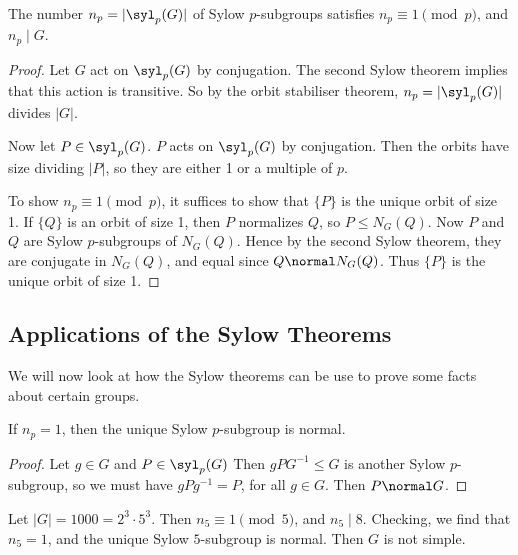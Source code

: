\documentclass[a4paper]{scrartcl}
\begin{document}
\begin{theorem}
	The number $n_p = |\syl_p(G)|$ of Sylow $p$-subgroups satisfies $n_p \equiv 1 \pmod{p}$, and $n_p \mid G$. 
\end{theorem}
\begin{proof}
	Let $G$ act on $\syl_p(G)$ by conjugation. The second Sylow theorem implies that this action is transitive. So by the orbit stabiliser theorem, $n_p = |\syl_p(G)|$ divides $|G|$.

	Now let $P \in \syl_p(G)$. $P$ acts on $\syl_p(G)$ by conjugation. Then the orbits have size dividing $|P|$, so they are either 1 or a multiple of $p$.

	To show $n_p \equiv 1 \pmod{p}$, it suffices to show that $\{P\}$ is the unique orbit of size 1. If $\{Q\}$ is an orbit of size 1, then $P$ normalizes $Q$, so $P \leq N_G(Q)$. Now $P$ and $Q$ are Sylow $p$-subgroups of $N_G(Q)$. Hence by the second Sylow theorem, they are conjugate in $N_G(Q)$, and equal since $Q \normal N_G(Q)$. Thus $\{P\}$ is the unique orbit of size 1.
\end{proof}


\subsection{Applications of the Sylow Theorems}

We will now look at how the Sylow theorems can be use to prove some facts about certain groups.

\begin{corollary}
	If $n_p = 1$, then the unique Sylow $p$-subgroup is normal.
\end{corollary}
\begin{proof}
Let $g \in G$ and $P \in \syl_p(G)$ Then $gPG^{-1} \leq G$ is another Sylow $p$-subgroup, so we must have $gPg^{-1} = P$, for all $g \in G$. Then $P \normal G$.
\end{proof}

\begin{example}
Let $|G| = 1000 = 2^3 \cdot 5^3$. Then $n_5 \equiv 1 \pmod{5}$, and $n_5 \mid 8$. Checking, we find that $n_5 = 1$, and the unique Sylow $5$-subgroup is normal. Then $G$ is not simple.
\end{example}
\end{document}
